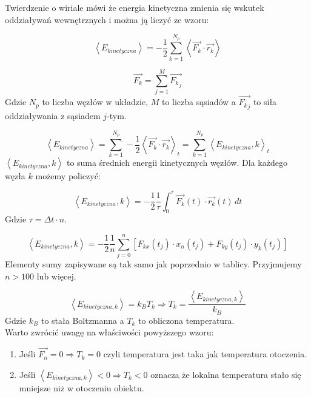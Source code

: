 \documentclass[12pt, letterpaper]{report}
\begin{document}
    Twierdzenie o wiriale mówi że energia kinetyczna zmienia się wskutek oddziaływań wewnętrznych i można ją 
    liczyć ze wzoru:

    \begin{equation}
        \left< E_{kinetyczna} \right>  = 
         - \frac{1}{2} \sum_{k = 1}^{N_p} \left< \vec{F_k} \cdot \vec{r_k} \right>
    \end{equation}

    \begin{equation}
        \vec{F_k} = \sum_{j = 1}^{M} \vec{{F_k}_j}
    \end{equation}
    Gdzie $N_p$ to liczba węzłów w układzie, $M$ to liczba sąsiadów a $\vec{{F_k}_j}$ to siła oddziaływania z sąsiadem $j$-tym.

    \begin{equation}
        \left< E_{kinetyczna} \right> = 
        \sum_{k = 1}^{N_p} -\frac{1}{2} \left< \vec{F_k} \cdot \vec{r_k} \right>_t =
        \sum_{k = 1}^{N_p} \left< E_{kinetyczna} , k \right>_t
    \end{equation}
    $\left< E_{kinetyczna} , k \right>$ to suma średnich energii kinetycznych węzłów. Dla każdego węzła $k$ możemy policzyć:

    \begin{equation}
        \left< E_{kinetyczna} , k \right> = 
        -\frac{1}{2} \frac{1}{\tau} \int_{0}^{\tau} \vec{F_k}(t) \cdot \vec{r_k}(t) \, dt
    \end{equation}
    Gdzie $\tau = \Delta t \cdot n$.

    \begin{equation}
        \left< E_{kinetyczna} , k \right> = 
        -\frac{1}{2} \frac{1}{n} \sum_{j = 0}^{n} \left[  F_{kx}(t_j) \cdot x_n(t_j) + F_{ky}(t_j) \cdot y_k(t_j) \right]
    \end{equation}
    Elementy sumy zapisywane są tak samo jak poprzednio w tablicy. Przyjmujemy $n > 100$ lub więcej. 

    \begin{equation}
        \left< E_{kinetyczna, k} \right> = k_B T_k \Rightarrow T_k = \frac{\left< E_{kinetyczna, k} \right>}{k_B}
    \end{equation}
    Gdzie $k_B$ to stała Boltzmanna a $T_k$ to obliczona temperatura. \\

    Warto zwrócić uwagę na właściwości powyższego wzoru:
    \begin{enumerate}
        \item Jeśli $\vec{F_n} = 0 \Rightarrow T_k = 0$ czyli temperatura jest taka jak temperatura otoczenia.
        \item Jeśli $\left< E_{kinetyczna, k} \right> < 0 \Rightarrow T_k < 0$ oznacza że lokalna 
        temperatura stało się mniejsze niż w otoczeniu obiektu.
    \end{enumerate}
\end{document}
